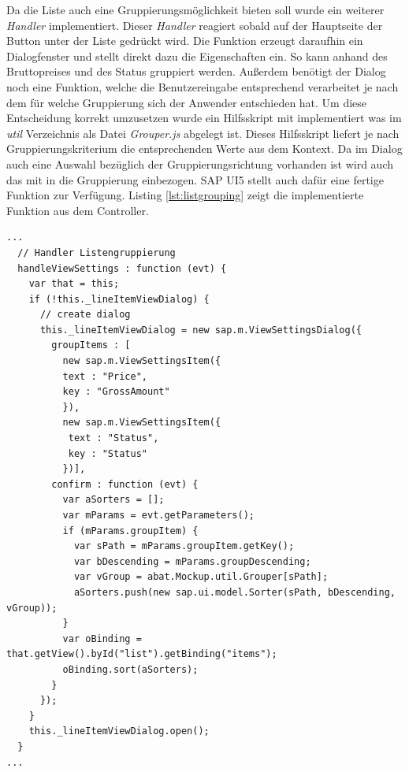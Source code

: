 Da die Liste auch eine Gruppierungsmöglichkeit bieten soll wurde ein weiterer \textit{Handler} implementiert. Dieser \textit{Handler} reagiert sobald auf der Hauptseite der Button unter der Liste gedrückt wird. Die Funktion erzeugt daraufhin ein Dialogfenster und stellt direkt dazu die Eigenschaften ein. So kann anhand des Bruttopreises und des Status gruppiert werden. Außerdem benötigt der Dialog noch eine Funktion, welche die Benutzereingabe entsprechend verarbeitet je nach dem für welche Gruppierung sich der Anwender entschieden hat. Um diese Entscheidung korrekt umzusetzen wurde ein Hilfsskript mit implementiert was im \textit{util} Verzeichnis als Datei \textit{Grouper.js} abgelegt ist. Dieses Hilfsskript liefert je nach Gruppierungskriterium die entsprechenden Werte aus dem Kontext. Da im Dialog auch eine Auswahl bezüglich der Gruppierungsrichtung vorhanden ist wird auch das mit in die Gruppierung einbezogen. SAP UI5 stellt auch dafür eine fertige Funktion zur Verfügung. Listing \ref{lst:listgrouping} zeigt die implementierte Funktion aus dem Controller.

\vspace{1em}
\begin{lstlisting}[frame=htrbl, caption=Handler der Listengruppierung, label=lst:listgrouping]
...
  // Handler Listengruppierung
  handleViewSettings : function (evt) {
    var that = this;
    if (!this._lineItemViewDialog) {
      // create dialog
      this._lineItemViewDialog = new sap.m.ViewSettingsDialog({
        groupItems : [
          new sap.m.ViewSettingsItem({
          text : "Price",
          key : "GrossAmount"
          }),
          new sap.m.ViewSettingsItem({
           text : "Status",
           key : "Status"
          })],
        confirm : function (evt) {
          var aSorters = [];
          var mParams = evt.getParameters();
          if (mParams.groupItem) {
            var sPath = mParams.groupItem.getKey();
            var bDescending = mParams.groupDescending;
       	    var vGroup = abat.Mockup.util.Grouper[sPath];
       	    aSorters.push(new sap.ui.model.Sorter(sPath, bDescending, vGroup));
          }
          var oBinding = that.getView().byId("list").getBinding("items");
          oBinding.sort(aSorters);
        }
      });
    }
    this._lineItemViewDialog.open();
  }
...
\end{lstlisting}


